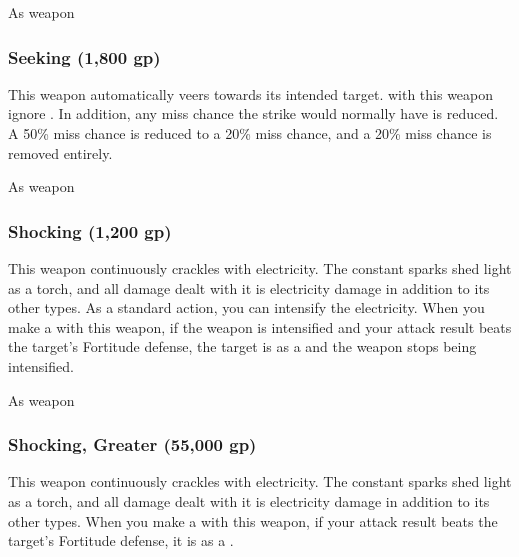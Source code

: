  


 As weapon


\lowercase{\hypertarget{item:Seeking}{}}\label{item:Seeking}
\hypertarget{item:Seeking}{\subsubsection{Seeking\hfill{} (1,800 gp)}}

This weapon automatically veers towards its intended target.
 with this weapon ignore .
In addition, any miss chance the strike would normally have is reduced.
A 50\% miss chance is reduced to a 20\% miss chance, and a 20\% miss chance is removed entirely.



 


 As weapon


\lowercase{\hypertarget{item:Shocking}{}}\label{item:Shocking}
\hypertarget{item:Shocking}{\subsubsection{Shocking\hfill{} (1,200 gp)}}

This weapon continuously crackles with electricity.
The constant sparks shed light as a torch, and all damage dealt with it is electricity damage in addition to its other types.
As a standard action, you can intensify the electricity.
When you make a  with this weapon, if the weapon is intensified and your attack result beats the target's Fortitude defense,
the target is \dazed as a  and the weapon stops being intensified.



 


 As weapon


\lowercase{\hypertarget{item:Shocking, Greater}{}}\label{item:Shocking, Greater}
\hypertarget{item:Shocking, Greater}{\subsubsection{Shocking, Greater\hfill{} (55,000 gp)}}

This weapon continuously crackles with electricity.
The constant sparks shed light as a torch, and all damage dealt with it is electricity damage in addition to its other types.
When you make a  with this weapon, if your attack result beats the target's Fortitude defense, it is \dazed as a .



